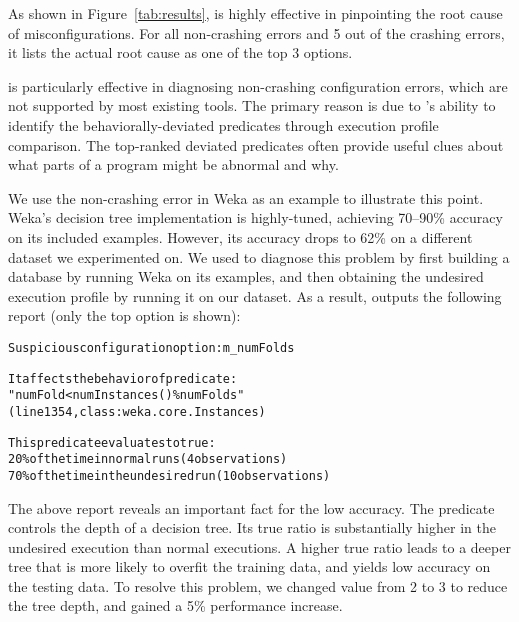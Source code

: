 

As shown in Figure~\ref{tab:results},
\ourtool is highly effective in pinpointing the root cause of
misconfigurations. For all \noncrash non-crashing errors
and 5 out of the \crash crashing errors, it lists the actual root cause as one of the top 3 options. 


\ourtool is particularly effective in diagnosing non-crashing configuration errors,
which are not supported by most existing tools. The primary reason is due to
\ourtool's ability to identify the behaviorally-deviated predicates through
execution profile comparison. The top-ranked deviated predicates often provide
useful clues about what parts of a program might be abnormal and why.

We use the non-crashing error in Weka as an example to illustrate
this point. 
Weka's decision tree implementation is highly-tuned, achieving 70--90\% accuracy on
its included examples. However, its accuracy drops to 62\%
on a different dataset we experimented on. We used \ourtool to diagnose this
problem by first building a database by running Weka on its examples, and
then
obtaining the undesired execution profile by running it on our dataset. As a result,
\ourtool outputs the following report (only the top option is shown):


\begin{CodeOut}
\begin{alltt} 
  Suspicious configuration option: m\_numFolds

  It affects the behavior of predicate:
  "numFold < numInstances() \% numFolds"
  (line 1354, class: weka.core.Instances) 

  This predicate evaluates to true:
    20\% of the time in normal runs (4 observations)
    70\% of the time in the undesired run (10 observations)

\end{alltt}
\end{CodeOut}

\vspace{-3mm}

The above report reveals an important fact for the low accuracy.
The predicate  controls
the depth of a decision tree. Its
true ratio is substantially higher in the undesired execution
than normal executions. A higher true ratio leads
to a deeper tree that is more likely to overfit the training
data, and yields low accuracy on the testing data.
To resolve this problem, we changed 
value from 2 to 3 to reduce the tree depth, and
gained a 5\% performance increase.


